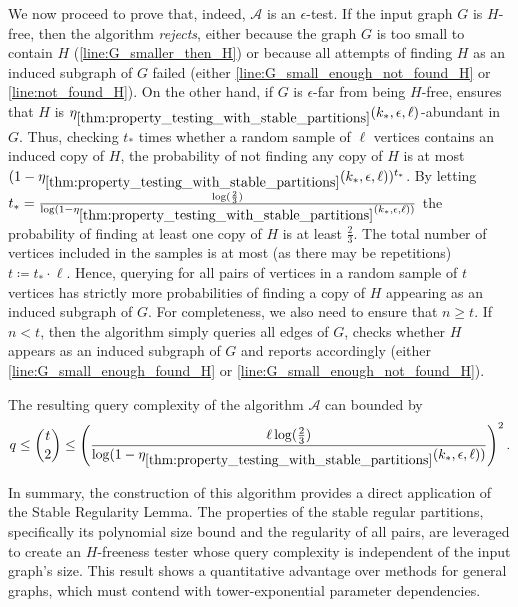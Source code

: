         We now proceed to prove that, indeed, $\mathcal{A}$ is an $\epsilon$-test.
        If the input graph $G$ is $H$-free, then the algorithm \emph{rejects}, either because the graph $G$ is too small to
        contain $H$ (\cref{line:G_smaller_then_H}) or because all attempts of finding $H$ as an induced subgraph of $G$
        failed (either \cref{line:G_small_enough_not_found_H} or \cref{line:not_found_H}).
        On the other hand, if $G$ is $\epsilon$-far from being $H$-free, 
        ensures that $H$ is $\eta_{\ref{thm:property_testing_with_stable_partitions}}(k_*, \epsilon, \ell)$-abundant in $G$.
        Thus, checking $t_*$ times whether a random sample of $\ell$ vertices contains an
        induced copy of $H$, the probability of not finding any copy of $H$ is at most
        $( 1 - \eta_{\ref{thm:property_testing_with_stable_partitions}}(k_*, \epsilon, \ell) )^{t_*}$.
        By letting $t_* = \frac{\log( \frac{2}{3} )}
            {\log( 1 - \eta_{\ref{thm:property_testing_with_stable_partitions}}(k_*, \epsilon, \ell) )}$
        the probability of finding at least one copy of $H$ is at least $\frac{2}{3}$.
        The total number of vertices included in the samples is at most (as there may be repetitions) $t \coloneqq t_* \cdot \ell$.
        Hence, querying for all pairs of vertices in a random sample of $t$ vertices has strictly more probabilities of
        finding a copy of $H$ appearing as an induced subgraph of $G$.
        For completeness, we also need to ensure that $n \geq t$.
        If $n < t$, then the algorithm simply queries all edges of $G$, checks whether $H$ appears as an induced subgraph
        of $G$ and reports accordingly (either \cref{line:G_small_enough_found_H} or \cref{line:G_small_enough_not_found_H}).

        The resulting query complexity of the algorithm $\mathcal{A}$ can bounded by
        \[
            q \leq {t \choose 2}
              \leq \left(  \frac{\ell \log( \frac{2}{3} )}
                   {\log( 1 - \eta_{\ref{thm:property_testing_with_stable_partitions}}(k_*, \epsilon, \ell) )} \right)^2.
        \]

        In summary, the construction of this algorithm provides a direct application of the Stable Regularity Lemma.
        The properties of the stable regular partitions, specifically its polynomial size bound and the regularity of all
        pairs, are leveraged to create an $H$-freeness tester whose query complexity is independent of the input graph's size.
        This result shows a quantitative advantage over methods for general graphs, which must contend with
        tower-exponential parameter dependencies.

